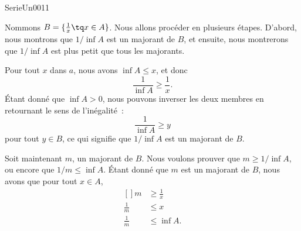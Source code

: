 

\begin{corrige}{SerieUn0011}

	Nommons $B=\{ \frac{1}{ x }\tq x\in A \}$. Nous allons procéder en plusieurs étapes. D'abord, nous montrons que $1/\inf A$ est un majorant de $B$, et ensuite, nous montrerons que $1/\inf A$ est plus petit que tous les majorants.
	
	Pour tout $x$ dans $a$, nous avons $\inf A\leq x$, et donc
	\begin{equation}
		\frac{1}{ \inf A }\geq \frac{1}{ x }.
	\end{equation}
	Étant donné que $\inf A>0$, nous pouvons inverser les deux membres en retournant le sens de l'inégalité~:
	\begin{equation}
		\frac{1}{ \inf A }\geq y
	\end{equation}
	pour tout $y\in B$, ce qui signifie que $1/\inf A$ est un majorant de $B$.

	Soit maintenant $m$, un majorant de $B$. Nous voulons prouver que $m\geq 1/\inf A$, ou encore que $1/m\leq \inf A$. Étant donné que $m$ est un majorant de $B$, nous avons que pour tout $x\in A$,
	\begin{equation}
		\begin{aligned}[]
			m		&\geq\frac{1}{ x }\\
			\frac{1}{ m }	&\leq x\\
			\frac{1}{ m }	&\leq\inf A.
		\end{aligned}
	\end{equation}

\end{corrige}

